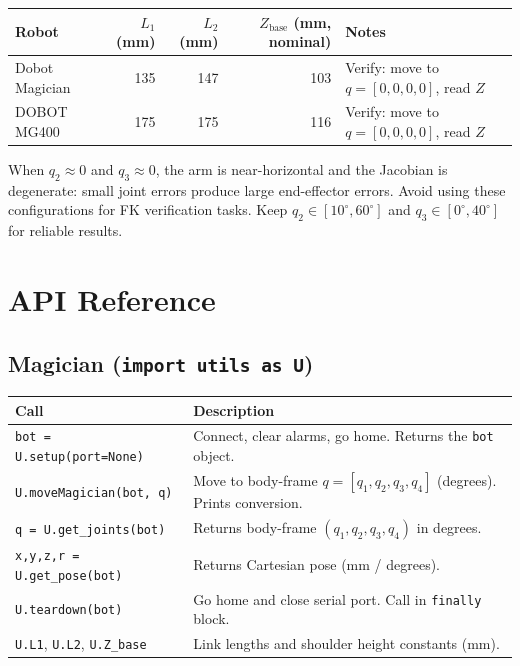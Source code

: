 \documentclass[11pt,a4paper]{article}
\begin{document}
\vspace{4pt}
\begin{tabularx}{\linewidth}{@{}lrrrl@{}}
  \toprule
  \textbf{Robot} & \textbf{$L_1$ (mm)} & \textbf{$L_2$ (mm)} & \textbf{$Z_{\text{base}}$ (mm, nominal)} & \textbf{Notes} \\
  \midrule
  Dobot Magician & 135 & 147 & 103 & Verify: move to $q=[0,0,0,0]$, read $Z$ \\
  DOBOT MG400    & 175 & 175 & 116 & Verify: move to $q=[0,0,0,0]$, read $Z$ \\
  \bottomrule
\end{tabularx}

\begin{tcolorbox}[safetybox, title={Singularity Warning}]
  When $q_2 \approx 0$ and $q_3 \approx 0$, the arm is near-horizontal and the
  Jacobian is degenerate: small joint errors produce large end-effector errors.
  Avoid using these configurations for FK verification tasks.
  Keep $q_2 \in [10^{\circ}, 60^{\circ}]$ and $q_3 \in [0^{\circ}, 40^{\circ}]$ for reliable results.
\end{tcolorbox}

\section{API Reference}

\subsection*{Magician (\texttt{import utils as U})}

\renewcommand{\arraystretch}{1.3}
\begin{tabularx}{\linewidth}{@{}lX@{}}
  \toprule
  \textbf{Call} & \textbf{Description} \\
  \midrule
  \texttt{bot = U.setup(port=None)} &
    Connect, clear alarms, go home. Returns the \texttt{bot} object. \\
  \texttt{U.moveMagician(bot, q)} &
    Move to body-frame $q=[q_1,q_2,q_3,q_4]$ (degrees). Prints conversion. \\
  \texttt{q = U.get\_joints(bot)} &
    Returns body-frame $(q_1,q_2,q_3,q_4)$ in degrees. \\
  \texttt{x,y,z,r = U.get\_pose(bot)} &
    Returns Cartesian pose (mm / degrees). \\
  \texttt{U.teardown(bot)} &
    Go home and close serial port. Call in \texttt{finally} block. \\
  \midrule
  \texttt{U.L1}, \texttt{U.L2}, \texttt{U.Z\_base} &
    Link lengths and shoulder height constants (mm). \\
  \bottomrule
\end{tabularx}
\end{document}
